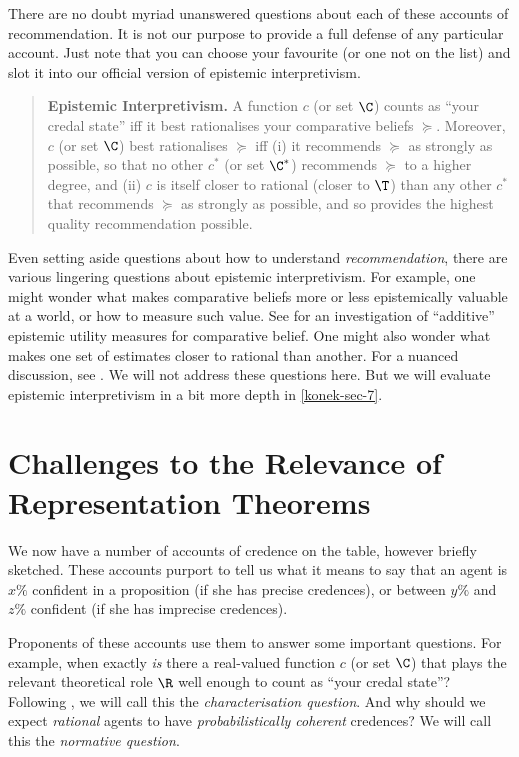There are no doubt myriad unanswered questions about each of these accounts of recommendation. It is not our purpose to provide a full defense of any particular account. Just note that you can choose your favourite (or one not on the list) and slot it into our official version of epistemic interpretivism.
\begin{quote}
\textbf{Epistemic Interpretivism.} A function $c$ (or set $\C$) counts as ``your credal state'' iff it best rationalises your comparative beliefs $\succeq$. Moreover, $c$ (or set $\C$) best rationalises $\succeq$ iff (i) it recommends $\succeq$ as strongly as possible, so that no other $c^*$ (or set $\C^*$) recommends $\succeq$ to a higher degree, and (ii) $c$ is itself closer to rational (closer to $\T$) than any other $c^*$ that recommends $\succeq$ as strongly as possible, and so provides the highest quality recommendation possible. 
\end{quote}

Even setting aside questions about how to understand \textit{recommendation}, there are various lingering questions about epistemic interpretivism. For example, one might wonder what makes comparative beliefs more or less epistemically valuable at a world, or how to measure such value. See \citet{Fitelson2015} for an investigation of ``additive'' epistemic utility measures for comparative belief. One might also wonder what makes one set of estimates closer to rational than another. For a nuanced discussion, see \citet{Staffel2018}. We will not address these questions here. But we will evaluate epistemic interpretivism in a bit more depth in \autoref{konek-sec-7}.


\section{Challenges to the Relevance of Representation Theorems}\label{konek-sec-4}

We now have a number of accounts of credence on the table, however briefly sketched. These accounts purport to tell us what it means to say that an agent is $x\%$ confident in a proposition (if she has precise credences), or between $y\%$ and $z\%$ confident (if she has imprecise credences).

Proponents of these accounts use them to answer some important questions. For example, when exactly \textit{is} there a real-valued function $c$ (or set $\C$) that plays the relevant theoretical role $\R$ well enough to count as ``your credal state''? Following \citet{Meacham2011}, we will call this the \textit{characterisation question}. And why should we expect \textit{rational} agents to have \textit{probabilistically coherent} credences? We will call this the \textit{normative question}.

